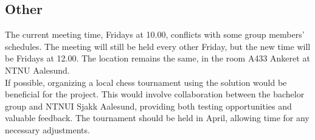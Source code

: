 \subsection{Other}
The current meeting time, Fridays at 10.00, conflicts with some group members' schedules. The meeting will still be held every other Friday, but the new time will be Fridays at 12.00. The location remains the same, in the room A433 Ankeret at NTNU Aalesund. \\

If possible, organizing a local chess tournament using the solution would be beneficial for the project. This would involve collaboration between the bachelor group and NTNUI Sjakk Aalesund, providing both testing opportunities and valuable feedback. The tournament should be held in April, allowing time for any necessary adjustments.